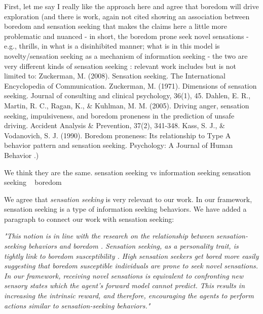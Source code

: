 \documentclass[utf8]{article}
\newenvironment{reply}  
    {\color{Blue}\noindent\newline}
    {\newline}
\begin{document}
        First, let me say I really like the approach here and agree that boredom will drive exploration (and there is work, again not cited showing an association between boredom and sensation seeking that makes the claims here a little more problematic and nuanced - in short, the boredom prone seek novel sensations - e.g., thrills, in what is a disinhibited manner; what is in this model is novelty/sensation seeking as a mechanism of information seeking - the two are very different kinds of sensation seeking : relevant work includes but is not limited to: Zuckerman, M. (2008). Sensation seeking. The International Encyclopedia of Communication. Zuckerman, M. (1971). Dimensions of sensation seeking. Journal of consulting and clinical psychology, 36(1), 45. Dahlen, E. R., Martin, R. C., Ragan, K., \& Kuhlman, M. M. (2005). Driving anger, sensation seeking, impulsiveness, and boredom proneness in the prediction of unsafe driving. Accident Analysis \& Prevention, 37(2), 341-348. Kass, S. J., \& Vodanovich, S. J. (1990). Boredom proneness: Its relationship to Type A behavior pattern and sensation seeking. Psychology: A Journal of Human Behavior .)
        
        We think they are the same.
        sensation seeking vs information seeking
        sensation seeking ~ boredom
        
        
        
        
        \begin{reply}
            We agree that \textit{sensation seeking} is very relevant to our work. In our framework, sensation seeking is a type of information seeking behaviors. We have added a paragraph to connect our work with sensation seeking:
        
        
            \textit{
                "This notion is in line with the research on the relationship between sensation-seeking behaviors and boredom \citep{zuckerman2008sensation, zuckerman1971dimensions, dahlen2005driving, kass1990boredom}. Sensation seeking, as a personality trait, is tightly link to boredom susceptibility \citep{zuckerman1978sensation}. High sensation seekers get bored more easily suggesting that boredom susceptible individuals are prone to seek novel sensations. In our framework, receiving novel sensations is equivalent to confronting new sensory states which the agent's forward model cannot predict. This results in increasing the intrinsic reward, and therefore, encouraging the agents to perform actions similar to sensation-seeking behaviors."}
        \end{reply}
        
\end{document}
